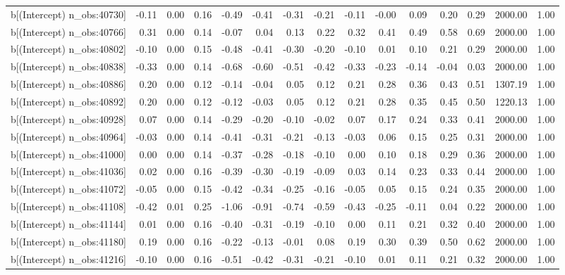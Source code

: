 \begin{table}[ht]
\begin{tabular}{rrrrrrrrrrrrrrr}
  b[(Intercept) n\_obs:40730] & -0.11 & 0.00 & 0.16 & -0.49 & -0.41 & -0.31 & -0.21 & -0.11 & -0.00 & 0.09 & 0.20 & 0.29 & 2000.00 & 1.00 \\ 
  b[(Intercept) n\_obs:40766] & 0.31 & 0.00 & 0.14 & -0.07 & 0.04 & 0.13 & 0.22 & 0.32 & 0.41 & 0.49 & 0.58 & 0.69 & 2000.00 & 1.00 \\ 
  b[(Intercept) n\_obs:40802] & -0.10 & 0.00 & 0.15 & -0.48 & -0.41 & -0.30 & -0.20 & -0.10 & 0.01 & 0.10 & 0.21 & 0.29 & 2000.00 & 1.00 \\ 
  b[(Intercept) n\_obs:40838] & -0.33 & 0.00 & 0.14 & -0.68 & -0.60 & -0.51 & -0.42 & -0.33 & -0.23 & -0.14 & -0.04 & 0.03 & 2000.00 & 1.00 \\ 
  b[(Intercept) n\_obs:40886] & 0.20 & 0.00 & 0.12 & -0.14 & -0.04 & 0.05 & 0.12 & 0.21 & 0.28 & 0.36 & 0.43 & 0.51 & 1307.19 & 1.00 \\ 
  b[(Intercept) n\_obs:40892] & 0.20 & 0.00 & 0.12 & -0.12 & -0.03 & 0.05 & 0.12 & 0.21 & 0.28 & 0.35 & 0.45 & 0.50 & 1220.13 & 1.00 \\ 
  b[(Intercept) n\_obs:40928] & 0.07 & 0.00 & 0.14 & -0.29 & -0.20 & -0.10 & -0.02 & 0.07 & 0.17 & 0.24 & 0.33 & 0.41 & 2000.00 & 1.00 \\ 
  b[(Intercept) n\_obs:40964] & -0.03 & 0.00 & 0.14 & -0.41 & -0.31 & -0.21 & -0.13 & -0.03 & 0.06 & 0.15 & 0.25 & 0.31 & 2000.00 & 1.00 \\ 
  b[(Intercept) n\_obs:41000] & 0.00 & 0.00 & 0.14 & -0.37 & -0.28 & -0.18 & -0.10 & 0.00 & 0.10 & 0.18 & 0.29 & 0.36 & 2000.00 & 1.00 \\ 
  b[(Intercept) n\_obs:41036] & 0.02 & 0.00 & 0.16 & -0.39 & -0.30 & -0.19 & -0.09 & 0.03 & 0.14 & 0.23 & 0.33 & 0.44 & 2000.00 & 1.00 \\ 
  b[(Intercept) n\_obs:41072] & -0.05 & 0.00 & 0.15 & -0.42 & -0.34 & -0.25 & -0.16 & -0.05 & 0.05 & 0.15 & 0.24 & 0.35 & 2000.00 & 1.00 \\ 
  b[(Intercept) n\_obs:41108] & -0.42 & 0.01 & 0.25 & -1.06 & -0.91 & -0.74 & -0.59 & -0.43 & -0.25 & -0.11 & 0.04 & 0.22 & 2000.00 & 1.00 \\ 
  b[(Intercept) n\_obs:41144] & 0.01 & 0.00 & 0.16 & -0.40 & -0.31 & -0.19 & -0.10 & 0.00 & 0.11 & 0.21 & 0.32 & 0.40 & 2000.00 & 1.00 \\ 
  b[(Intercept) n\_obs:41180] & 0.19 & 0.00 & 0.16 & -0.22 & -0.13 & -0.01 & 0.08 & 0.19 & 0.30 & 0.39 & 0.50 & 0.62 & 2000.00 & 1.00 \\ 
  b[(Intercept) n\_obs:41216] & -0.10 & 0.00 & 0.16 & -0.51 & -0.42 & -0.31 & -0.21 & -0.10 & 0.01 & 0.11 & 0.21 & 0.32 & 2000.00 & 1.00 \\ 

\end{tabular}
\end{table}
